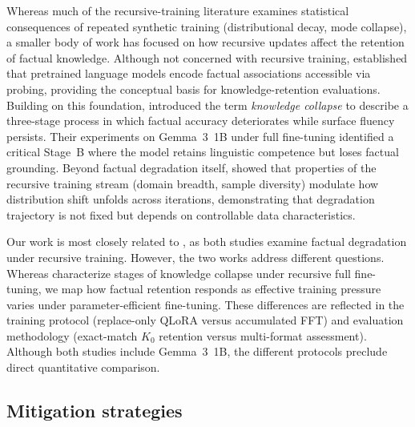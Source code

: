 \documentclass[a4paper,fleqn]{cas-dc}
\begin{document}
Whereas much of the recursive-training literature examines statistical
consequences of repeated synthetic training (distributional decay, mode
collapse), a smaller body of work has focused on how recursive updates affect
the retention of factual knowledge. Although not concerned with recursive
training, \citet{petroni2019} established that pretrained language models encode
factual associations accessible via probing, providing the conceptual basis for
knowledge-retention evaluations. Building on this foundation,
\citet{keisha2025} introduced the term \textit{knowledge collapse} to describe a
three-stage process in which factual accuracy deteriorates while surface fluency
persists. Their experiments on Gemma~3~1B under full fine-tuning identified a
critical Stage~B where the model retains linguistic competence but loses factual
grounding. Beyond factual degradation itself, \citet{kovac2025recursive}
showed that properties of the recursive training stream (domain breadth, sample
diversity) modulate how distribution shift unfolds across iterations,
demonstrating that degradation trajectory is not fixed but depends on
controllable data characteristics.

Our work is most closely related to \citet{keisha2025}, as both studies examine
factual degradation under recursive training. However, the two works address
different questions. Whereas \citet{keisha2025} characterize stages of knowledge
collapse under recursive full fine-tuning, we map how factual retention responds
as effective training pressure varies under parameter-efficient fine-tuning.
These differences are reflected in the training protocol (replace-only QLoRA
versus accumulated FFT) and evaluation methodology (exact-match $K_0$ retention
versus multi-format assessment). Although both studies include Gemma~3~1B, the
different protocols preclude direct quantitative comparison.

\subsection{Mitigation strategies}
\end{document}
